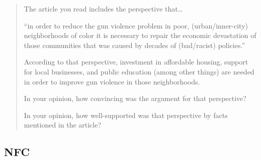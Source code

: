\documentclass[
]{book}
\begin{document}
\begin{quote}
The article you read includes the perspective that\ldots{}

``in order to reduce the gun violence problem in poor, (urban/inner-city) neighborhoods of color it is necessary to repair the economic devastation of those communities that was caused by decades of (bad/racist) policies.''

According to that perspective, investment in affordable housing, support for local businesses, and public education (among other things) are needed in order to improve gun violence in those neighborhoods.

In your opinion, how convincing was the argument for that perspective?

In your opinion, how well-supported was that perspective by facts mentioned in the article?
\end{quote}

\hypertarget{nfc}{%
\subsection{NFC}\label{nfc}}
\end{document}
